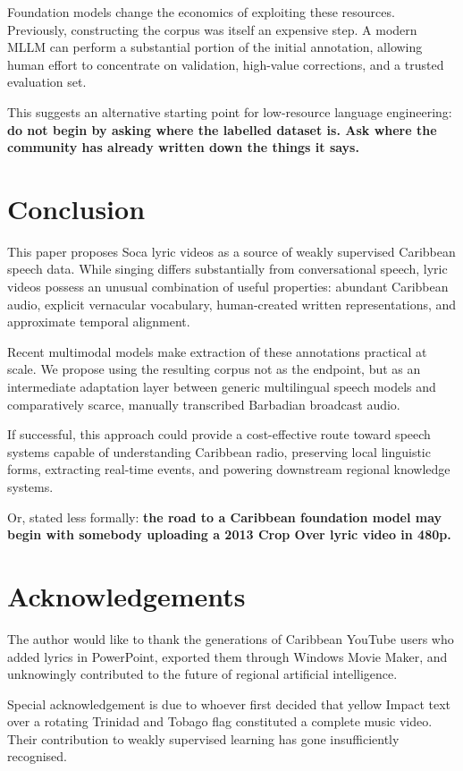 \documentclass[10pt,twocolumn]{article}
\begin{document}
Foundation models change the economics of exploiting these resources. Previously, constructing the corpus was itself an expensive step. A modern MLLM can perform a substantial portion of the initial annotation, allowing human effort to concentrate on validation, high-value corrections, and a trusted evaluation set.

This suggests an alternative starting point for low-resource language engineering: \textbf{do not begin by asking where the labelled dataset is. Ask where the community has already written down the things it says.}

\section{Conclusion}
This paper proposes Soca lyric videos as a source of weakly supervised Caribbean speech data. While singing differs substantially from conversational speech, lyric videos possess an unusual combination of useful properties: abundant Caribbean audio, explicit vernacular vocabulary, human-created written representations, and approximate temporal alignment.

Recent multimodal models make extraction of these annotations practical at scale. We propose using the resulting corpus not as the endpoint, but as an intermediate adaptation layer between generic multilingual speech models and comparatively scarce, manually transcribed Barbadian broadcast audio.

If successful, this approach could provide a cost-effective route toward speech systems capable of understanding Caribbean radio, preserving local linguistic forms, extracting real-time events, and powering downstream regional knowledge systems.

Or, stated less formally: \textbf{the road to a Caribbean foundation model may begin with somebody uploading a 2013 Crop Over lyric video in 480p.}

\section*{Acknowledgements}
The author would like to thank the generations of Caribbean YouTube users who added lyrics in PowerPoint, exported them through Windows Movie Maker, and unknowingly contributed to the future of regional artificial intelligence.

Special acknowledgement is due to whoever first decided that yellow Impact text over a rotating Trinidad and Tobago flag constituted a complete music video. Their contribution to weakly supervised learning has gone insufficiently recognised.
\end{document}
